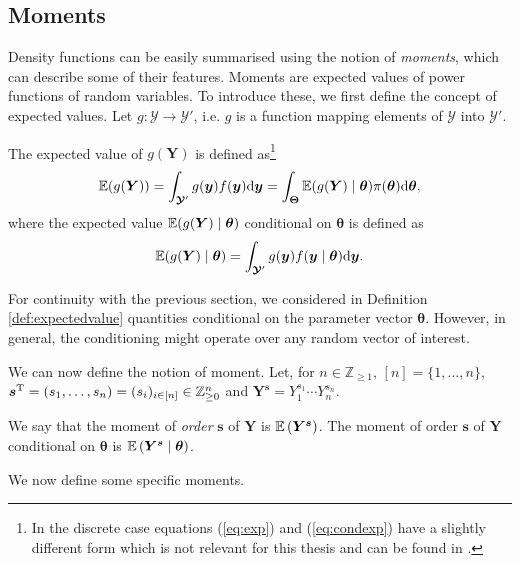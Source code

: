 \subsection{Moments}
Density functions can be easily summarised using the notion of \textit{moments}, which can describe some of their features. Moments are expected values of power functions of random variables. To introduce these, we first define the concept of expected  values. Let $g:\bm{\mathcal{Y}}\rightarrow \bm{\mathcal{Y}}'$, i.e. $g$ is a function mapping elements of $\bm{\mathcal{Y}}$ into $\bm{\mathcal{Y}}'$. 

\begin{definition}
\label{def:expectedvalue}
The expected value of $g(\bm{Y})$ is defined as\footnote{In the discrete case equations (\ref{eq:exp}) and (\ref{eq:condexp}) have a slightly different form which is not relevant for this thesis and can be found in \citet{Casella2002}.}
\begin{equation}
\label{eq:exp}
\E(g(\bm{Y}))=\int_{\bm{\mathcal{Y}}'}g(\bm{y})f(\bm{y})\dr \bm{y}=\int_{\bm{\Theta}}\E(g(\bm{Y})\;|\;\bm{\theta})\pi(\bm{\theta})\dr \bm{\theta},
\end{equation}
where the expected value $\mathbb{E}(g(\bm{Y})\;|\;\bm{\theta})$ conditional  on $\bm{\theta}$ is defined as
\begin{equation}
\label{eq:condexp}
\E(g(\bm{Y})\;|\;\bm{\theta})=\int_{\bm{\mathcal{Y}}'}g(\bm{y})f(\bm{y}\;|\;\bm{\theta})\dr\bm{y}.
\end{equation}
\end{definition}
For continuity with the previous section, we considered in Definition \ref{def:expectedvalue} quantities conditional on the parameter vector $\bm{\theta}$. However, in general, the conditioning might operate over any random vector of interest.

We can now define the notion of moment. Let, for $n\in\mathbb{Z}_{\geq 1}$, $[n]=\{1,\dots,n\}$, $\bm{s}^{\textnormal{T}}=(s_1,\dots,s_n)=(s_i)_{i\in[n]}\in \mathbb{Z}_{\geq 0}^n$ and $\bm{Y}^{\bm{s}}=Y_1^{s_1}\cdots Y_n^{s_n}$. 

\begin{definition}
We say that the moment of \emph{order} $\bm{s}$ of $\bm{Y}$ is $\mathbb{E}\left(\bm{Y}^{\bm{s}}\right)$. The moment of order $\bm{s}$ of $\bm{Y}$ conditional on $\bm{\theta}$ is $\mathbb{E}\left(\bm{Y}^{\bm{s}}\;|\;\bm{\theta}\right)$. 
\end{definition}

 We now define some specific moments.

